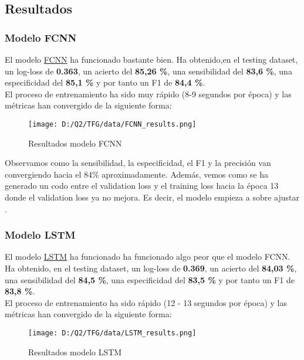 \documentclass[10pt,riqno,a4paper,twoside]{article}\usepackage[]{graphicx}\usepackage[]{color}
\begin{document}
\subsection{Resultados}

\subsubsection{Modelo FCNN}

El modelo \hyperref[red_FCNN]{FCNN} ha funcionado bastante bien. Ha obtenido,en el testing dataset, un log-loss de \textbf{0.363}, un acierto del \textbf{85,26 \%}, una sensibilidad del \textbf{83,6 \%}, una especificidad del \textbf{85,1 \%} y por tanto un F1 de \textbf{84,4 \%}. \\

El proceso de entrenamiento ha sido muy rápido (8-9 segundos por época) y las métricas han convergido de la siguiente forma: 

\begin{figure}[h]
\caption{Resultados modelo FCNN}
\begin{center}
\texttt{[image: D:/Q2/TFG/data/FCNN\_results.png]}
\end{center}

\end{figure}

Observamos como la sensibilidad, la especificidad, el F1 y la precisión van convergiendo hacia el 84\% aproximadamente. Además, vemos como se ha generado un codo entre el validation loss y el training loss hacia la época 13 donde el validation loss ya no mejora. Es decir, el modelo empieza a sobre ajustar .

\subsubsection{Modelo LSTM}

El modelo \hyperref[LSTM_model]{LSTM} ha funcionado ha funcionado algo peor que el modelo FCNN. Ha obtenido, en el testing dataset, un log-loss de \textbf{0.369}, un acierto del \textbf{84,03 \%}, una sensibilidad del \textbf{84,5 \%}, una especificidad del \textbf{83,5 \%} y por tanto un F1 de \textbf{83,8 \%}. \\

El proceso de entrenamiento ha sido rápido (12 - 13 segundos por época) y las métricas han convergido de la siguiente forma: 

\begin{figure}[h]
\caption{Resultados modelo LSTM}
\begin{center}
\texttt{[image: D:/Q2/TFG/data/LSTM\_results.png]}
\end{center}

\end{figure}
\end{document}
